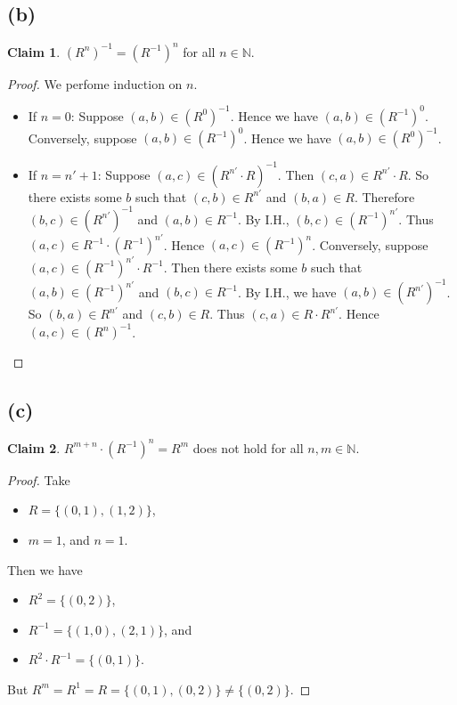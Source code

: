 \documentclass[autodetect-enginem]{article}
\theoremstyle{plain}
\theoremstyle{definition}
\theoremstyle{definition}
\newtheorem{claim}{Claim}
\begin{document}
\subsection*{(b)}
    \begin{claim}
        $(R^n)^{-1} = (R^{-1})^n$ for all $n \in \mathbb{N}$.
    \end{claim}
    \begin{proof}
        We perfome induction on $n$.
        \begin{itemize}
            \item If $n = 0$: Suppose $(a,b) \in (R^0)^{-1}$.
                    Hence we have $(a,b) \in (R^{-1})^0$.
                    Conversely, suppose $(a,b) \in (R^{-1})^0$.
                    Hence we have $(a,b) \in (R^0)^{-1}$.
            \item If $n = n' + 1$: Suppose $(a,c) \in (R^{n'} \cdot R)^{-1}$.
                    Then $(c,a) \in R^{n'} \cdot R$.
                    So there exists some $b$ such that $(c,b) \in R^{n'}$ and $(b,a) \in R$.
                    Therefore $(b,c) \in (R^{n'})^{-1}$ and $(a,b) \in R^{-1}$.
                    By I.H., $(b,c) \in (R^{-1})^{n'}$.
                    Thus $(a,c) \in R^{-1} \cdot (R^{-1})^{n'}$.
                    Hence $(a,c) \in (R^{-1})^{n}$.
                    Conversely, suppose $(a,c) \in (R^{-1})^{n'} \cdot R^{-1}$.
                    Then there exists some $b$ such that $(a,b) \in (R^{-1})^{n'}$ and $(b,c) \in R^{-1}$.
                    By I.H., we have $(a,b) \in (R^{n'})^{-1}$.
                    So $(b,a) \in R^{n'}$ and $(c,b) \in R$.
                    Thus $(c,a) \in R \cdot R^{n'}$.
                    Hence $(a,c) \in (R^{n})^{-1}$.
            \end{itemize}
    \end{proof}

\subsection*{(c)}
    \begin{claim}
        $R^{m+n} \cdot (R^{-1})^n = R^m$ does not hold for all $n,m \in \mathbb{N}$.
    \end{claim}
    \begin{proof}
        Take
            \begin{itemize}
                \item $R =\{(0,1), (1,2)\}$,
                \item $m=1$, and $n=1$.
            \end{itemize}
        Then we have
            \begin{itemize}
                \item $R^2 = \{(0,2)\}$,
                \item $R^{-1} = \{(1,0), (2,1)\}$, and
                \item $R^2 \cdot R^{-1} = \{(0,1)\}$.
            \end{itemize}
        But $R^m = R^1 = R = \{(0,1), (0,2)\} \neq \{(0,2)\}$.
    \end{proof}
\end{document}

